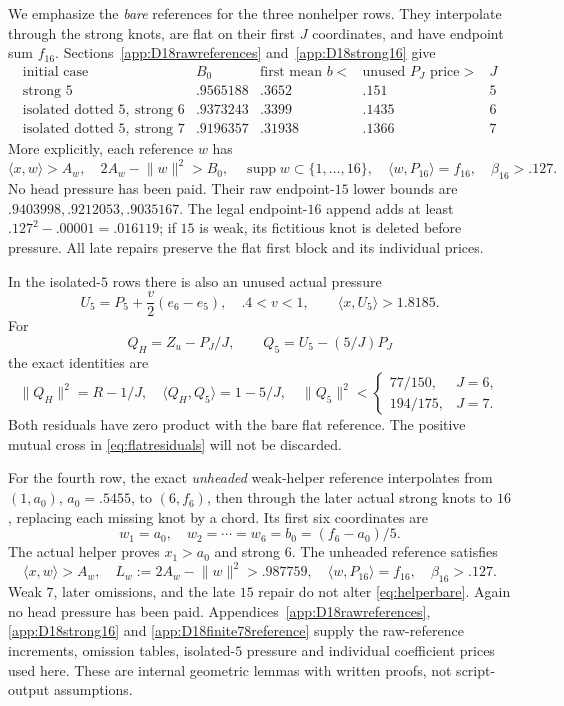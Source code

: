 \documentclass[11pt]{article}
\theoremstyle{definition}
\theoremstyle{remark}
\newcommand{\ip}[2]{\langle #1,#2\rangle}
\newcommand{\norm}[1]{\lVert #1\rVert}
\begin{document}
We emphasize the \emph{bare} references for the three nonhelper
rows. They interpolate through the strong knots, are flat on
their first \(J\) coordinates, and have endpoint sum \(f_{16}\).
Sections~\ref{app:D18rawreferences} and~\ref{app:D18strong16} give
\[
\begin{array}{c|c|c|c|c}
\text{initial case}&B_0&\text{first mean }b<
 &\text{unused }P_J\text{ price}>&J\\ \hline
\text{strong }5&.9565188&.3652&.151&5\\
\text{isolated dotted }5,\ \text{strong }6&.9373243&.3399&.1435&6\\
\text{isolated dotted }5,\ \text{strong }7&.9196357&.31938&.1366&7
\end{array}
\]
More explicitly, each reference \(w\) has
\[
 \ip{x}{w}>A_w,\quad 2A_w-\norm{w}^2>B_0,\quad
 \operatorname{supp}w\subset\{1,\ldots,16\},\quad
 \ip{w}{P_{16}}=f_{16},\quad \beta_{16}>.127.
\]
No head pressure has been paid. Their raw endpoint-\(15\)
lower bounds are \(.9403998,\allowbreak .9212053,\allowbreak .9035167\).
The legal endpoint-\(16\) append adds at least
\(.127^2-.00001=.016119\); if \(15\) is weak, its fictitious
knot is deleted before pressure. All late repairs preserve the
flat first block and its individual prices.

In the isolated-\(5\) rows there is also an unused actual pressure
\[
 U_5=P_5+\frac v2(e_6-e_5),\quad .4<v<1,\qquad
 \ip{x}{U_5}>1.8185.
\]
For
\[
 Q_H=Z_u-P_J/J,\qquad Q_5=U_5-(5/J)P_J
\]
the exact identities are
\begin{equation}
\label{eq:flatresiduals}
 \norm{Q_H}^2=R-1/J,\quad
 \ip{Q_H}{Q_5}=1-5/J,\quad
 \norm{Q_5}^2<
 \begin{cases}77/150,&J=6,\\194/175,&J=7.\end{cases}
\end{equation}
Both residuals have zero product with the bare flat reference.
The positive mutual cross in \eqref{eq:flatresiduals} will
not be discarded.

For the fourth row, the exact \emph{unheaded} weak-helper
reference interpolates from
\((1,a_0)\), \(a_0=.5455\), to \((6,f_6)\), then through
the later actual strong knots to \(16\), replacing each missing
knot by a chord. Its first six coordinates are
\begin{equation}
\label{eq:helperbare}
 w_1=a_0,\quad w_2=\cdots=w_6=b_0=(f_6-a_0)/5.
\end{equation}
The actual helper proves \(x_1>a_0\) and strong \(6\).
The unheaded reference satisfies
\[
 \ip{x}{w}>A_w,\quad L_w:=2A_w-\norm{w}^2>.987759,\quad
 \ip{w}{P_{16}}=f_{16},\quad \beta_{16}>.127.
\]
Weak \(7\), later omissions, and the late \(15\) repair do not
alter \eqref{eq:helperbare}. Again no head pressure has been paid.
Appendices~\ref{app:D18rawreferences}, \ref{app:D18strong16}
and \ref{app:D18finite78reference} supply the raw-reference increments,
omission tables, isolated-\(5\) pressure and individual coefficient
prices used here. These are internal geometric lemmas with written
proofs, not script-output assumptions.
\end{document}
